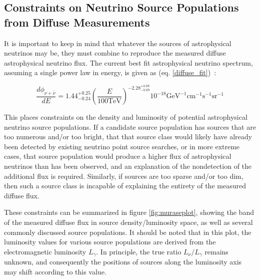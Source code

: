 \subsection{Constraints on Neutrino Source Populations from Diffuse Measurements}
It is important to keep in mind that whatever the sources of astrophysical neutrinos may be, they must combine to reproduce the measured diffuse astrophysical neutrino flux. The current best fit astrophysical neutrino spectrum, assuming a single power law in energy, is given as (eq. \ref{diffuse_fit})~\cite{stettner2019measurement}:

\begin{equation}
    \frac{d\phi_{\nu+\bar{\nu}}}{dE} = 1.44_{-0.24}^{+0.25} (\frac{E}{100 \textrm{TeV}})^{-2.28_{-0.09}^{+0.08}} 10^{-18} \textrm{GeV}^{-1}\textrm{cm}^{-1}\textrm{s}^{-1}\textrm{sr}^{-1}
\label{diffuse_fit}
\end{equation}

This places constraints on the density and luminosity of potential astrophysical neutrino source populations. If a candidate source population has sources that are too numerous and/or too bright, that that source class would likely have already been detected by existing neutrino point source searches, or in more extreme cases, that source population would produce a higher flux of astrophysical neutrinos than has been observed, and an explanation of the nondetection of the additional flux is required. Similarly, if sources are too sparse and/or too dim, then such a source class is incapable of explaining the entirety of the measured diffuse flux. 

These constraints can be summarized in figure \ref{fig:muraseplot}, showing the band of the measured diffuse flux in source density/luminosity space, as well as several commonly discussed source populations. It should be noted that in this plot, the luminosity values for various source populations are derived from the electromagnetic luminosity $L_\gamma$. In principle, the true ratio $L_\nu/L_\gamma$ remains unknown, and consequently the positions of sources along the luminosity axis may shift according to this value. 


